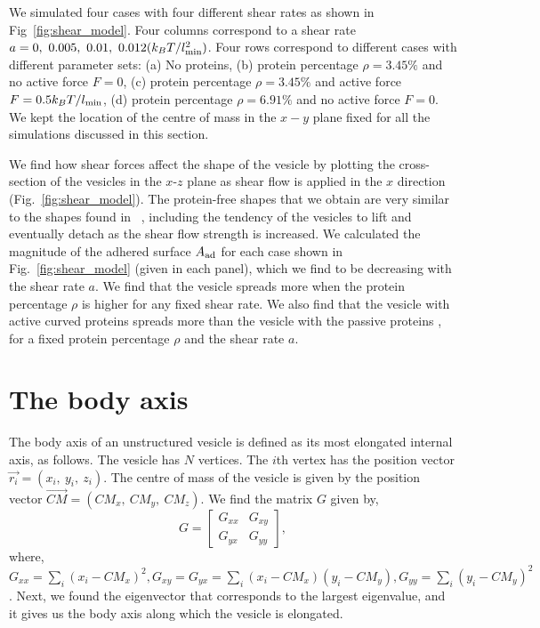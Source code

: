 \documentclass[aps,article,amsmath]{revtex4-2}
\begin{document}
We simulated four cases with four different shear rates as shown in Fig~\ref{fig:shear_model}. Four columns correspond to a shear rate $a=0,~0.005,~0.01,~0.012 (k_BT/l_{\rm min}^2)$. Four rows correspond to different cases with different parameter sets: (a) No proteins, (b) protein percentage $\rho=3.45\%$ and no active force $F=0$, (c) protein percentage $\rho=3.45\%$ and active force $F=0.5 k_BT/l_{\rm min}$, (d) protein percentage $\rho=6.91\%$ and no active force $F=0$.
We kept the location of the centre of mass in the $x-y$ plane fixed for all the simulations discussed in this section. 

We find how shear forces affect the shape of the vesicle by plotting the cross-section of the vesicles in the $x$-$z$ plane as shear flow is applied in the $x$ direction (Fig.~\ref{fig:shear_model}). The protein-free shapes that we obtain are very similar to the shapes found in ~\cite{Cantat1999a}, including the tendency of the vesicles to lift and eventually detach as the shear flow strength is increased.
We calculated the magnitude of the adhered surface $A_{\rm ad}$ for each case shown in Fig.~\ref{fig:shear_model} (given in each panel), which we find to be decreasing with the shear rate $a$. We find that the vesicle spreads more when the protein percentage $\rho$ is higher for any fixed shear rate. We also find that the vesicle with active curved proteins spreads more than the vesicle with the passive proteins \cite{sadhu2021modelling}, for a fixed protein percentage $\rho$ and the shear rate $a$. 

\section{The body axis}
The body axis of an unstructured vesicle is defined as its most elongated internal axis, as follows.
The vesicle has $N$ vertices. The $i$th vertex has the position vector $\overrightarrow{r_i}=(x_i, ~y_i, ~z_i)$. The centre of mass of the vesicle is given by the position vector $\overrightarrow{CM}=(CM_x,~CM_y, ~CM_z)$. We find the matrix $G$ given by,
\begin{equation}
     G=\begin{bmatrix}
   G_{xx} & G_{xy}\\
  G_{yx} & G_{yy}
   \end{bmatrix},
\end{equation}
where, $G_{xx}=\sum_i{(x_i-CM_x)^2}, G_{xy}=G_{yx}=\sum_i{(x_i-CM_x)(y_i-CM_y)}, G_{yy}=\sum_i{(y_i-CM_y)^2}$. Next, we found the eigenvector that corresponds to the largest eigenvalue, and it gives us the body axis along which the vesicle is elongated.
\end{document}
